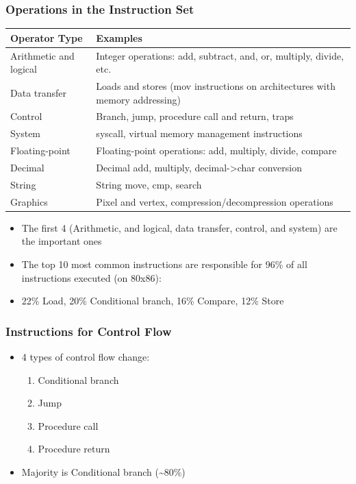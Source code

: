 \subsubsection{Operations in the Instruction Set}
\begin{center}
\begin{tabularx}{\textwidth}{l X}
\hline
\textbf{Operator Type} & \textbf{Examples} \\ 
\hline
Arithmetic and logical & Integer operations: add, subtract, and, or, multiply, divide, etc. \\
\hline 
Data transfer & Loads and stores (mov instructions on architectures with memory addressing) \\
\hline 
Control & Branch, jump, procedure call and return, traps \\
\hline 
System & syscall, virtual memory management instructions \\ 
\hline 
Floating-point & Floating-point operations: add, multiply, divide, compare \\ 
\hline 
Decimal & Decimal add, multiply, decimal->char conversion \\
\hline 
String & String move, cmp, search \\ 
\hline
Graphics & Pixel and vertex, compression/decompression operations \\
\hline
\end{tabularx}
\end{center}
\begin{itemize}
  \item The first 4 (Arithmetic, and logical, data transfer, control, and system) are the important ones 
  \item The top 10 most common instructions are responsible for 96\% of all instructions executed (on 80x86):
  \item 22\% Load, 20\% Conditional branch, 16\% Compare, 12\% Store  
\end{itemize}
\subsubsection{Instructions for Control Flow}
\begin{itemize}
  \item 4 types of control flow change:
  \begin{enumerate}
    \item Conditional branch
    \item Jump 
    \item Procedure call 
    \item Procedure return
  \end{enumerate}
  \item Majority is Conditional branch (\textasciitilde 80\%)
\end{itemize}
